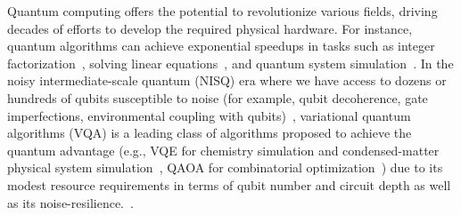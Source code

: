 \documentclass[conference,9pt]{IEEEtran}
\newcommand{\note}[1]{{\color{blue} #1}}
\newcommand{\JC}[1]{{\color{red} [JC: #1]}}
\begin{document}
    Quantum computing offers the potential to revolutionize various fields, driving decades of efforts to develop the required physical hardware. For instance, quantum algorithms can achieve exponential speedups in tasks such as integer factorization~\cite{shor1994algorithms}, solving linear equations~\cite{harrow2009quantum}, and quantum system simulation~\cite{lloyd1996universal}. In the noisy intermediate-scale quantum (NISQ) era where we have access to dozens or hundreds of qubits susceptible to noise (for example, qubit decoherence, gate imperfections, environmental coupling with qubits)~\cite{preskill2018quantum}, variational quantum algorithms (VQA) is a leading class of algorithms proposed to achieve the quantum advantage (e.g., VQE for chemistry simulation and condensed-matter physical system simulation~\cite{peruzzo2014variational}, QAOA for combinatorial optimization~\cite{farhi2014quantum}) due to its modest resource requirements in terms of qubit number and circuit depth as well as its noise-resilience.~\cite{cerezo2021variational}.


\end{document}
